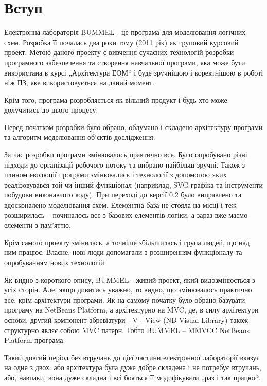 \documentclass[12pt,a4paper]{article}
\begin{document}
\fontsize{14pt}{6mm}\selectfont

\tableofcontents
\clearpage
\setcounter{page}{6}
\pagestyle{plain}
\section{Вступ}

Електронна лабораторія BUMMEL - це програма для моделювання логічних схем. Розробка її почалась два роки тому (2011 рік) як груповий курсовий проект. Метою даного проекту є вивчення сучасних технологій розробки програмного забезпечення та створення навчальної програми, яка може бути використана в курсі „Архітектура ЕОМ“ і буде зручнішою і коректнішою в роботі ніж ПЗ, яке використовується на даний момент.

Крім того, програма розробляється як вільний продукт \cite{thesis-foss2013} і будь-хто може долучитись до цього процесу.

Перед початком розробки було обрано, обдумано і складено архітектуру програми та алгоритм моделювання об’єктів дослідження.

За час розробки програми змінювалось практично все. Було опробувано різні підходи до організації робочого потоку \cite{thesis-MPoAMaCS} та вибрано найбільш зручні. Також з плином еволюції програми змінювались і технології з допомогою яких реалізовувався той чи інший функціонал (наприклад, SVG графіка та інструменти побудови виконавчого коду). При переході до версії 0.2 було виправлено та вдосконалено моделювання схем. Елементна база не стояла на місці і теж розширилась -- починалось все з базових елементів логіки, а зараз вже маємо елементи з пам’яттю.

Крім самого проекту змінилась, а точніше збільшилась і група людей, що над ним працює. Власне, нові люди допомагали з розширенням функціоналу та опробуванням нових технологій.

Як видно з короткого опису, BUMMEL - живий проект, який видозмінюється з усіх сторін. Але, якщо дивитись уважно, то видно, що змінювалось практично все, крім архітектури програми. Як на самому початку було обрано базувати програму на NetBeans Platform, а архітектурно на MVC, де, в силу архітектури основи, другий компонент абревіатури - V - View (NB Visual Library) також структурно являє собою MVC патерн. Тобто BUMMEL -- MMVCC NetBeans Platform програма.

Такий довгий період без втручань до цієї частини електронної лабораторії вказує на одне з двох: або архітектура була дуже добре складена і не потребує втручань, або, навпаки, вона дуже складна і всі бояться її модифікувати „раз і так працює“.
\end{document}
